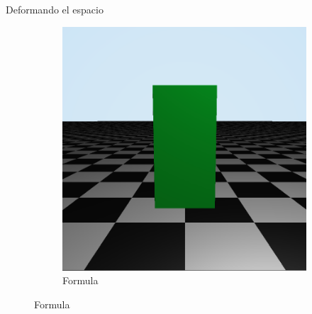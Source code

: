 \begin{frame}{Deformando el espacio}
\begin{figure}[htp]
\begin{subfigure}[b]{0.22\textwidth}
   \includegraphics[width=\textwidth]{img/estable}
   \caption{Formula}
 \end{subfigure}
\end{figure} 

\end{frame}

